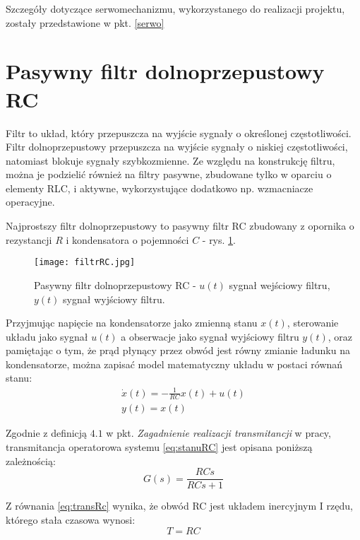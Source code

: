 Szczegóły dotyczące serwomechanizmu, wykorzystanego do realizacji projektu, zostały przedstawione w pkt. \ref{serwo}  
\section{Pasywny filtr dolnoprzepustowy RC}

Filtr to układ, który przepuszcza na wyjście sygnały o określonej częstotliwości. Filtr dolnoprzepustowy przepuszcza na wyjście sygnały o niskiej częstotliwości, natomiast blokuje sygnały szybkozmienne. Ze względu na konstrukcję filtru, można je podzielić również na filtry pasywne, zbudowane tylko w oparciu o elementy RLC, i aktywne, wykorzystujące dodatkowo np. wzmacniacze operacyjne. 

Najprostszy filtr dolnoprzepustowy to pasywny filtr RC zbudowany z opornika o rezystancji $R$ i kondensatora o pojemności $C$ - rys. \ref{fig:filtrRC1}. 
\begin{figure}[h]
    \centering
    \texttt{[image: filtrRC.jpg]}
    \caption{Pasywny filtr dolnoprzepustowy RC - $u(t)$ sygnał wejściowy filtru, $y(t)$ sygnał wyjściowy filtru.}
    \label{fig:filtrRC1}
\end{figure}


Przyjmując napięcie na kondensatorze jako zmienną stanu $x(t)$, sterowanie układu jako sygnał $u(t)$ a obserwacje jako sygnał wyjściowy filtru $y(t)$, oraz pamiętając o tym, że prąd płynący przez obwód jest równy zmianie ładunku na kondensatorze, można zapisać model matematyczny układu w postaci równań stanu:
\begin{equation}
\begin{gathered}
    \dot{x}(t) = -\frac{1}{RC}x(t) + u(t) \\
    y(t) = x(t)
     \label{eq:stanuRC}
\end{gathered}
\end{equation}

Zgodnie z definicją $4.1$ w pkt. \textit{Zagadnienie realizacji transmitancji} w pracy\cite{graba}, transmitancja operatorowa systemu \ref{eq:stanuRC} jest opisana poniższą zależnością:
\begin{equation}
    G(s) = \frac{RCs}{RCs + 1}
    \label{eq:transRc}
\end{equation}

Z równania \ref{eq:transRc} wynika, że obwód RC jest  układem inercyjnym I rzędu, którego stała czasowa wynosi:
\begin{equation}
   T = RC
    \label{eq:stalaCzasowaRC}
\end{equation}

